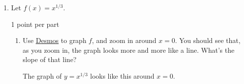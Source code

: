 \documentclass{article}
\makeatletter
\let\@href=\href
\renewcommand{\href}[2]{\@href{#1}{\ul{#2}}}
\makeatother
\begin{document}
\begin{enumerate}
\begin{enumerate}
  \item

    \begin{problem}[\vfill]
      $f(x) =\displaystyle \frac{x^2 + 7}{(2x)^3}$
    \end{problem}

    \begin{solution}
      First we use algebra to rewrite $f(x)$ as $\frac{1}{8}x^{-1} + \frac{7}{8}x^{-3}$.
      Then we can use the derivative rules we've learned: 
      $f'(x) = \frac{1}{8}(-x^{-2}) + 
      \frac{7}{8}(-3x^{-4}) =$ 
    \end{solution}

  \item
    \begin{problem}[\vfill]
      $f(x) = \dfrac{1}{\sqrt[4]{16x^3}} + \sqrt[5]{\pi} + \dfrac{1}{17}$
    \end{problem}

    \begin{solution}
      First we use algebra to rewrite $f(x)$ as $\frac{1}{2}x^{-3/4} + \sqrt[5]{\pi} + \tfrac{1}{17}$. Remember that $\sqrt[5]{\pi}$ and $\tfrac{1}{17}$ are constants, not
      variables. Using derivative rules, we find that $f'(x) = \frac{1}{2}(-\frac{3}{4}
      x^{-7/4})=$ 
    \end{solution}

  \end{enumerate}

\item  Let $f(x) = x^{1/3}$.

  \begin{grading}
    1 point per part
  \end{grading}

  \begin{enumerate}
  \item

    \begin{problem}[\vfill]
      Use \href{https://www.desmos.com/calculator}{Desmos} to graph $f$, and zoom in around $x = 0$. You should see that, as you zoom in, the graph looks more and more like a line. What's the slope of that line?
    \end{problem}

    \begin{solution}
      The graph of $y=x^{1/3}$ looks like this around $x=0$.



\end{solution}
\end{enumerate}
\end{enumerate}
\end{document}
